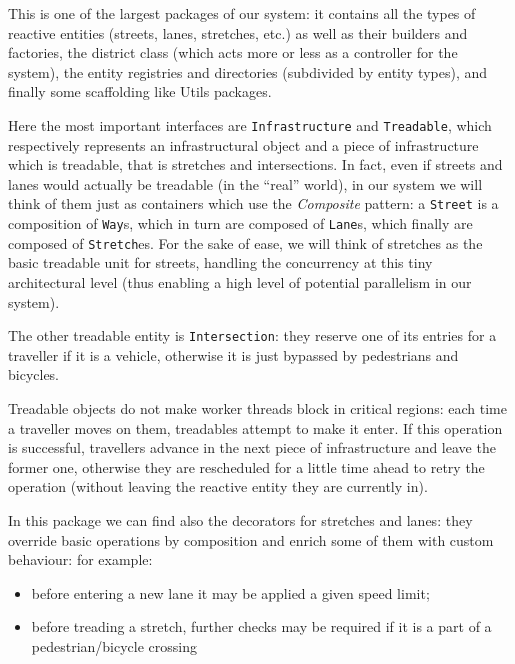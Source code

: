 This is one of the largest packages of our system: it contains all the types of
reactive entities (streets, lanes, stretches, etc.) as well as their builders
and factories, the district class (which acts more or less as a controller for
the system), the entity registries and directories (subdivided by entity types),
and finally some scaffolding like Utils packages.

Here the most important interfaces are \texttt{Infrastructure} and
\texttt{Treadable}, which respectively represents an infrastructural object and
a piece of infrastructure which is treadable, that is stretches and
intersections.
In fact, even if streets and lanes would actually be treadable (in the ``real''
world), in our system we will think of them just as containers which use the
\textit{Composite} pattern: a \texttt{Street} is a composition of \texttt{Way}s,
which in turn are composed of \texttt{Lane}s, which finally are composed of
\texttt{Stretch}es.
For the sake of ease, we will think of stretches as the basic treadable unit
for streets, handling the concurrency at this tiny architectural level (thus
enabling a high level of potential parallelism in our system).

The other treadable entity is \texttt{Intersection}: they reserve one of its
entries for a traveller if it is a vehicle, otherwise it is just bypassed by
pedestrians and bicycles.

Treadable objects do not make worker threads block in critical regions: each
time a traveller moves on them, treadables attempt to make it enter. If this
operation is successful, travellers advance in the next piece of infrastructure
and leave the former one, otherwise they are rescheduled for a little time ahead
to retry the operation (without leaving the reactive entity they are currently
in).

In this package we can find also the decorators for stretches and lanes: they
override basic operations by composition and enrich some of them with custom
behaviour: for example:
\begin{itemize}
  \item before entering a new lane it may be applied a given speed limit;
  \item before treading a stretch, further checks may be required if it is a
    part of a pedestrian/bicycle crossing
 \end{itemize}
